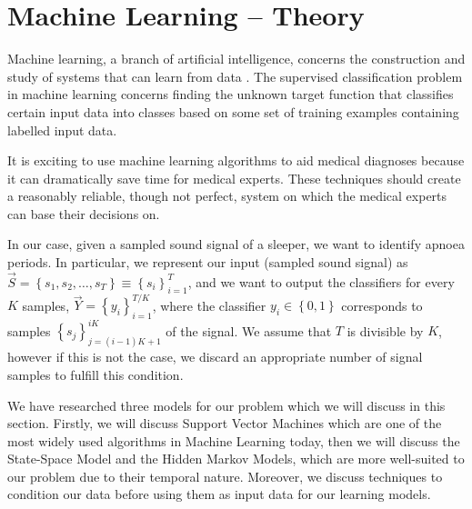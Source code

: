 \section{Machine Learning -- Theory}
\label{sec:mltheory-ta}
	Machine learning, a branch of artificial intelligence, concerns the construction and study of systems that can learn from data \cite{wiki:machineLearning}. The supervised classification problem in machine learning concerns finding the unknown target function that classifies certain input data into classes based on some set of training examples containing labelled input data.

	It is exciting to use machine learning algorithms to aid medical diagnoses because it can dramatically save time for medical experts. These techniques should create a reasonably reliable, though not perfect, system on which the medical experts can base their decisions on.
	
	In our case, given a sampled sound signal of a sleeper, we want to identify apnoea periods. In particular, we represent our input (sampled sound signal) as $\vec S = \left\{s_1, s_2, \dotsc, s_T \right\} \equiv \left\{ s_i \right\}_{i = 1}^{T}$, and we want to output the classifiers for every $K$ samples, $\vec Y = \left\{ y_i \right\}_{i = 1}^{T/K}$, where the classifier $y_i \in \left\{0, 1\right\}$ corresponds to samples $\left\{ s_j \right\}_{j = \left(i - 1\right)K + 1}^{iK}$ of the signal. We assume that $T$ is divisible by $K$, however if this is not the case, we discard an appropriate number of signal samples to fulfill this condition.

	We have researched three models for our problem which we will discuss in this section. Firstly, we will discuss Support Vector Machines which are one of the most widely used algorithms in Machine Learning today, then we will discuss the State-Space Model and the Hidden Markov Models, which are more well-suited to our problem due to their temporal nature. Moreover, we discuss techniques to condition our data before using them as input data for our learning models.
	




